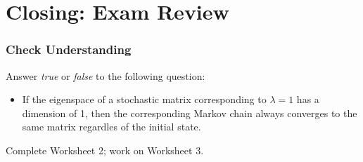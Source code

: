 \documentclass{beamer}
\begin{document}
	\section{Closing: Exam Review}
	\begin{frame}
		\frametitle{Check Understanding}
	Answer \textit{true} or \textit{false} to the following question:
		\begin{itemize}
			\item<1-> If the eigenspace of a stochastic matrix corresponding to \(\lambda = 1\) has a dimension of 1, then the corresponding Markov chain
					always converges to the same matrix regardles of the initial state.
		\end{itemize} \pause 
		Complete Worksheet 2; work on Worksheet 3. 
	\end{frame}
\end{document}
